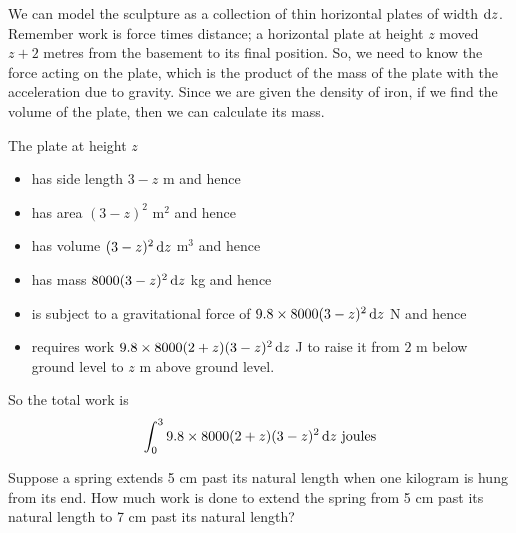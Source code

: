\begin{solution}
We can model the sculpture as a collection of thin horizontal plates of width $\mathrm{d}z$. Remember work is force times distance; a horizontal plate at height $z$ moved $z+2$ metres from the basement to its final position. So, we need to know the force acting on the plate, which is the product of the mass of the plate with the acceleration due to gravity. Since we are given the density of iron, if we find the volume of the plate, then we can calculate its mass.
 \begin{center}
\end{center}
 The plate at height $z$
\begin{itemize}
\item has side length $3-z$ m and hence
\item has area $(3-z)^2$ m$^2$ and hence
\item  has volume $(3-z)^2\,\mathrm{d}z$ m$^3$ and hence
\item  has mass $8000 (3-z)^2\,\mathrm{d}z$ kg and hence
\item is subject to a gravitational force of
$9.8\times 8000 (3-z)^2\,\mathrm{d}z$ N and hence
\item   requires work $9.8\times 8000 (2+z)(3-z)^2\,\mathrm{d}z$ J
to raise it from $2$ m below ground level to $z$ m above ground
level.
\end{itemize}
So the total work is
\begin{equation*}
\int_0^3 9.8\times 8000 (2+z)(3-z)^2\,\mathrm{d}z\ \text{joules}
\end{equation*}
\end{solution}
\begin{question}
Suppose a spring extends 5 cm past its natural length when one kilogram is hung from its end. How much work is done to extend the spring from 5 cm past its natural length to 7 cm past its natural length?
\end{question}
